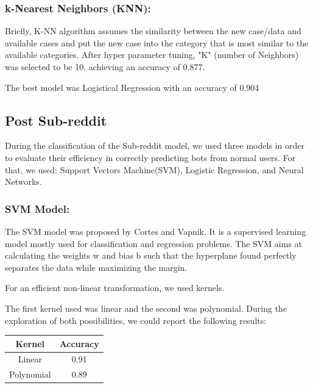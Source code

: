 \documentclass{article}
\begin{document}
 \subsubsection{k-Nearest Neighbors (KNN):}   
Briefly, K-NN algorithm assumes the similarity between the new case/data and available cases and put the new case into the category that is most similar to the available categories.
After hyper parameter tuning, "K" (number of Neighbors) was selected to be 10, achieving an accuracy of 0.877. 

        The best model was Logistical Regression with an accuracy of 0.904

    \subsection{Post Sub-reddit}  
    
    
    During the classification of  the Sub-reddit model, we used three models in order to evaluate their efficiency in correctly predicting bots from normal users. For that, we used: Support Vectors Machine(SVM), Logistic Regression, and Neural Networks.
    
    \subsubsection{SVM Model:}
    
    The SVM model was proposed by Cortes and Vapnik. It is a supervised learning model mostly used for classification and regression problems. The SVM aims at calculating the weights w and bias b such that the hyperplane found perfectly separates the data while maximizing the margin.
    
    For an efficient non-linear transformation, we used kernels.
    
    The first kernel used was linear and the second was polynomial. During the exploration of both possibilities, we could report the following results:
    
    \begin{center}
    \begin{tabular}{||c c||} 
     \hline
     Kernel & Accuracy    \\ [0.5ex] 
     \hline\hline
     Linear & 0.91  \\ 
     \hline
     Polynomial & 0.89  \\
     \hline
    \end{tabular}
    \end{center}
    
\end{document}

